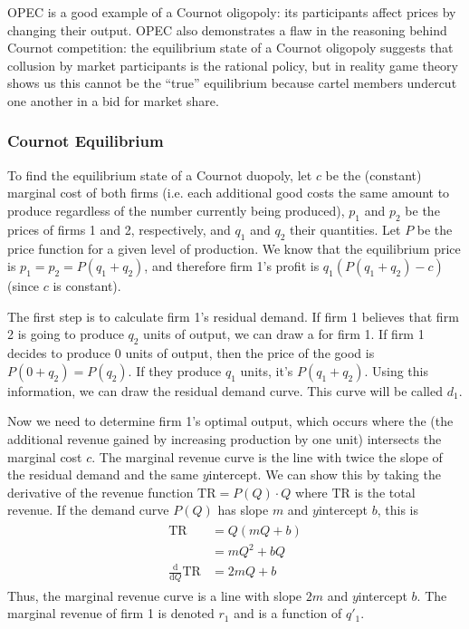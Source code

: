 \documentclass[letterpaper,10pt,english]{jupyterBook}
\begin{document}
\sphinxAtStartPar
OPEC is a good example of a Cournot oligopoly: its participants affect prices by changing their output. OPEC also demonstrates a flaw in the reasoning behind Cournot competition: the equilibrium state of a Cournot oligopoly suggests that collusion by market participants is the rational policy, but in reality game theory shows us this cannot be the “true” equilibrium because cartel members undercut one another in a bid for market share.


\subsubsection{Cournot Equilibrium}
\label{\detokenize{content/07-game-theory/cournot:cournot-equilibrium}}
\sphinxAtStartPar
To find the equilibrium state of a Cournot duopoly, let \(c\) be the (constant) marginal cost of both firms (i.e. each additional good costs the same amount to produce regardless of the number currently being produced), \(p_1\) and \(p_2\) be the prices of firms 1 and 2, respectively, and \(q_1\) and \(q_2\) their quantities. Let \(P\) be the price function for a given level of production. We know that the equilibrium price is \(p_1 = p_2 = P(q_1 + q_2)\), and therefore firm 1’s profit is \(q_1(P(q_1 + q_2) - c)\) (since \(c\) is constant).

\sphinxAtStartPar
The first step is to calculate firm 1’s residual demand. If firm 1 believes that firm 2 is going to produce \(q_2\) units of output, we can draw a  for firm 1. If firm 1 decides to produce 0 units of output, then the price of the good is \(P(0 + q_2) = P(q_2)\). If they produce \(q_1\) units, it’s \(P(q_1 + q_2)\). Using this information, we can draw the residual demand curve. This curve will be called \(d_1\).

\sphinxAtStartPar
Now we need to determine firm 1’s optimal output, which occurs where the  (the additional revenue gained by increasing production by one unit) intersects the marginal cost \(c\). The marginal revenue curve is the line with twice the slope of the residual demand and the same \(y\)\sphinxhyphen{}intercept. We can show this by taking the derivative of the revenue function \(\text{TR} = P(Q) \cdot Q\) where \(\text{TR}\) is the total revenue. If the demand curve \(P(Q)\) has slope \(m\) and \(y\)\sphinxhyphen{}intercept \(b\), this is
\begin{equation*}
\begin{split}\begin{aligned}
\text{TR} &= Q (mQ + b) \\
&= m Q^2 + bQ \\
\frac{\text{d}}{\text{d} Q} \text{TR} &= 2mQ + b
\end{aligned}\end{split}
\end{equation*}
\sphinxAtStartPar
Thus, the marginal revenue curve is a line with slope \(2m\) and \(y\)\sphinxhyphen{}intercept \(b\). The marginal revenue of firm 1 is denoted \(r_1\) and is a function of \(q'_1\).
\end{document}
